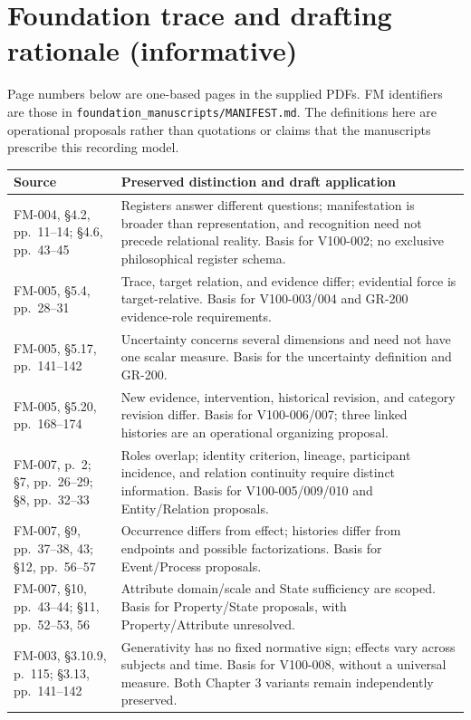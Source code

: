 \documentclass[11pt,a4paper]{article}
\begin{document}
\section{Foundation trace and drafting rationale (informative)}
Page numbers below are one-based pages in the supplied PDFs. FM identifiers are those in \texttt{foundation\_manuscripts/MANIFEST.md}. The definitions here are operational proposals rather than quotations or claims that the manuscripts prescribe this recording model.

\begin{longtable}{@{}L{0.28\textwidth}L{0.66\textwidth}@{}}
\toprule
Source & Preserved distinction and draft application \\
\midrule\endhead
FM-004, \S4.2, pp.~11--14; \S4.6, pp.~43--45 & Registers answer different questions; manifestation is broader than representation, and recognition need not precede relational reality. Basis for V100-002; no exclusive philosophical register schema. \\
FM-005, \S5.4, pp.~28--31 & Trace, target relation, and evidence differ; evidential force is target-relative. Basis for V100-003/004 and GR-200 evidence-role requirements. \\
FM-005, \S5.17, pp.~141--142 & Uncertainty concerns several dimensions and need not have one scalar measure. Basis for the uncertainty definition and GR-200. \\
FM-005, \S5.20, pp.~168--174 & New evidence, intervention, historical revision, and category revision differ. Basis for V100-006/007; three linked histories are an operational organizing proposal. \\
FM-007, p.~2; \S7, pp.~26--29; \S8, pp.~32--33 & Roles overlap; identity criterion, lineage, participant incidence, and relation continuity require distinct information. Basis for V100-005/009/010 and Entity/Relation proposals. \\
FM-007, \S9, pp.~37--38, 43; \S12, pp.~56--57 & Occurrence differs from effect; histories differ from endpoints and possible factorizations. Basis for Event/Process proposals. \\
FM-007, \S10, pp.~43--44; \S11, pp.~52--53, 56 & Attribute domain/scale and State sufficiency are scoped. Basis for Property/State proposals, with Property/Attribute unresolved. \\
FM-003, \S3.10.9, p.~115; \S3.13, pp.~141--142 & Generativity has no fixed normative sign; effects vary across subjects and time. Basis for V100-008, without a universal measure. Both Chapter 3 variants remain independently preserved. \\
\bottomrule
\end{longtable}
\end{document}
